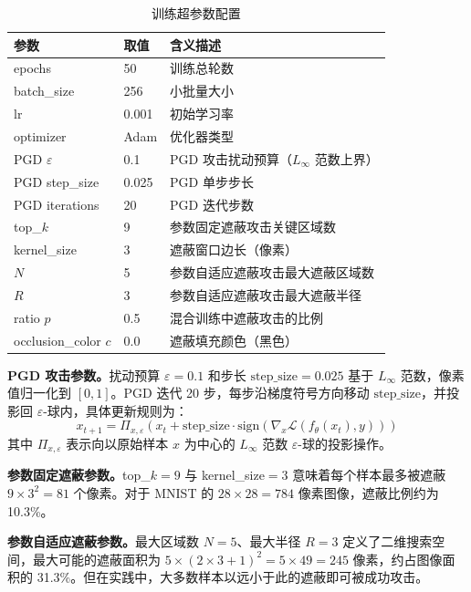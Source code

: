 \begin{table}[htbp]
  \centering
  \caption{训练超参数配置}
  \label{tab:training_params}
  \begin{tabular}{llp{5.5cm}}
    \toprule
    参数 & 取值 & 含义描述 \\
    \midrule
    epochs & 50 & 训练总轮数 \\
    batch\_size & 256 & 小批量大小 \\
    lr & 0.001 & 初始学习率 \\
    optimizer & Adam & 优化器类型 \\
    PGD $\varepsilon$ & 0.1 & PGD 攻击扰动预算（$L_\infty$ 范数上界）\\
    PGD step\_size & 0.025 & PGD 单步步长 \\
    PGD iterations & 20 & PGD 迭代步数 \\
    top\_$k$ & 9 & 参数固定遮蔽攻击关键区域数 \\
    kernel\_size & 3 & 遮蔽窗口边长（像素） \\
    $N$ & 5 & 参数自适应遮蔽攻击最大遮蔽区域数 \\
    $R$ & 3 & 参数自适应遮蔽攻击最大遮蔽半径 \\
    ratio $p$ & 0.5 & 混合训练中遮蔽攻击的比例 \\
    occlusion\_color $c$ & 0.0 & 遮蔽填充颜色（黑色） \\
    \bottomrule
  \end{tabular}
\end{table}

\textbf{PGD 攻击参数。}扰动预算 $\varepsilon=0.1$ 和步长 $\mathrm{step\_size}=0.025$ 基于 $L_{\infty}$ 范数，像素值归一化到 $[0,1]$。PGD 迭代 20 步，每步沿梯度符号方向移动 $\mathrm{step\_size}$，并投影回 $\varepsilon$-球内，具体更新规则为：
\begin{equation}
  x_{t+1} = \Pi_{x,\varepsilon}\!\left(x_t + \mathrm{step\_size} \cdot \mathrm{sign}\!\left(\nabla_x \mathcal{L}(f_\theta(x_t), y)\right)\right)
\end{equation}
其中 $\Pi_{x,\varepsilon}$ 表示向以原始样本 $x$ 为中心的 $L_\infty$ 范数 $\varepsilon$-球的投影操作。

\textbf{参数固定遮蔽参数。}top\_$k=9$ 与 kernel\_size$=3$ 意味着每个样本最多被遮蔽 $9 \times 3^2 = 81$ 个像素。对于 MNIST 的 $28 \times 28 = 784$ 像素图像，遮蔽比例约为 10.3\%。

\textbf{参数自适应遮蔽参数。}最大区域数 $N=5$、最大半径 $R=3$ 定义了二维搜索空间，最大可能的遮蔽面积为 $5 \times (2 \times 3+1)^2 = 5 \times 49 = 245$ 像素，约占图像面积的 31.3\%。但在实践中，大多数样本以远小于此的遮蔽即可被成功攻击。



